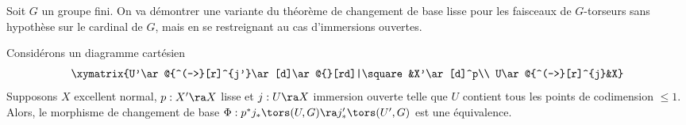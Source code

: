 \documentclass[10pt]{../fichiers-configuration-latex/smfart}
\begin{document}
Soit $G$ un groupe fini. On va démontrer une variante du théorème de changement de base lisse
 pour les faisceaux de $G$-torseurs sans hypothèse sur le cardinal de $G$, mais en
se restreignant au cas d'immersions ouvertes.

\begin{theoreme2}[Gabber]\label{20-cbl}Considérons un diagramme cartésien
$$\xymatrix{U'\ar@{^(->}[r]^{j'}\ar[d]\ar@{}[rd]|\square&X'\ar[d]^p\\ U\ar@{^(->}[r]^{j}&X}$$
Supposons $X$ excellent normal, $p:X'\ra X$ lisse et $j:U\ra X$  immersion ouverte telle que $U$
contient tous les points de codimension $\leq 1$. Alors, le morphisme de changement de base
$\Phi:p^*j_*\tors(U,G)\ra j'_*\tors(U',G)$ est une équivalence.  \end{theoreme2}
\end{document}
